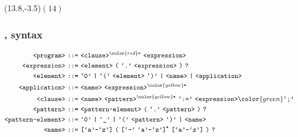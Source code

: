 \begin{frame}

\begin{textblock}{1}(13.8,-3.5)$(14)$\end{textblock}

\frametitle{\D{}, syntax}

\begin{align*}
\nonterm{program}\ \textt{::=}&\ \nonterm{clause}^{\color{red}\textt{+}}
\ \nonterm{expression}
& \\
\nonterm{expression}\ \textt{::=}&\ \nonterm{element}\ \textt{(}\ \term{.}
\ \nonterm{expression}\ \textt{)}\ \textt{?}
& \\
\nonterm{element}\ \textt{::=}&\ \term{0}\ \textt{|}\ \term{(}
\ \nonterm{element}\ \term{)}\ \textt{|}\ \nonterm{name}\ \textt{|}
\ \nonterm{application}
& \\
\nonterm{application}\ \textt{::=}&\ \nonterm{name}
\ \nonterm{expression}^{\color{yellow}\textt{*}}
& \\
\nonterm{clause}\ \textt{::=}&\ \nonterm{name}
\ \nonterm{pattern}^{\color{yellow}\textt{*}}\ \term{:=}
\ \nonterm{expression}{\color{green}\term{;}}
& \\
\nonterm{pattern}\ \textt{::=}&\ \nonterm{pattern-element}\ \textt{(}
\ \term{.}\ \nonterm{pattern}\ \textt{)}\ \textt{?}
& \\
\nonterm{pattern-element}\ \textt{::=}&\ \term{0}\ \textt{|}\ \term{\_}
\ \textt{|}\ \term{(}\ \nonterm{pattern}\ \term{)}\ \textt{|}\ \nonterm{name}
& \\
\nonterm{name}\ \textt{::=}&\ \textt{[}\term{a}\mathmono{-}\term{z}\textt{]}
\ \textt{(}\ \textt{[}\term{-}\ \term{a}\mathmono{-}\term{z}\textt{]}^\textt{*}
\ \textt{[}\term{a}\mathmono{-}\term{z}\textt{]}\ \textt{)}\ \textt{?}
\end{align*}




\end{frame}
